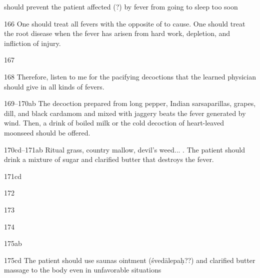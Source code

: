 \begin{translation}
    should prevent the patient affected (?) by fever from going to sleep too
    soon
    
    \item[166]  One should treat all fevers with the opposite of to cause. One
    should treat the root disease when the fever has arisen from hard work,
    depletion, and infliction of injury.
    
   \item[167]  
    
    \item[168]  Therefore, listen to me for the pacifying decoctions that the
    learned physician should give in all kinds of fevers.
    
    
    \item[169--170ab]  The decoction prepared from long pepper, Indian
    sarsaparillas, grapes, dill, and black cardamom and mixed with jaggery
    beats the fever generated by wind.  Then, a drink of boiled milk or the
    cold decoction of heart-leaved moonseed should be offered.
    
    \item[170cd--171ab]  Ritual grass, country mallow, devil's weed... . The patient should drink a mixture of sugar
    and clarified butter that destroys the fever.
    
   \item[171cd]  
    
   \item[172]  
    
   \item[173]  
    
   \item[174]  
    
   \item[175ab]  
    
    \item[175cd]  The patient should use saunas ointment (śvedālepaḥ??) and
    clarified butter massage to the body even in unfavorable situations 
    
    
\end{translation}